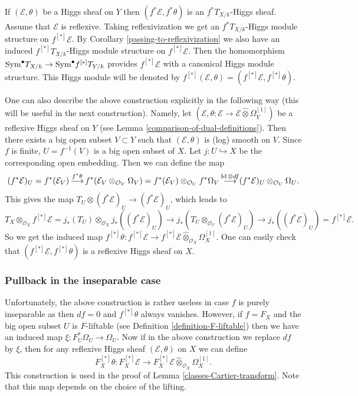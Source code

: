 \documentclass[12pt]{article}
\theoremstyle{plain}
\theoremstyle{definition}
\theoremstyle{remark}
\newcommand{\cE}{{\mathcal E}}
\newcommand{\cO}{{\mathcal O}}
\newcommand{\id}{\mathop{\rm Id}}
\newcommand{\Sym}{{\mathop{{\rm Sym}}}}
\begin{document}
If $(\cE, \theta)$ be a Higgs sheaf on $Y$ then 
$(f^*\cE , f^*\theta)$ is an $f^*T_{X/k}$-Higgs sheaf. Assume that $\cE$ is reflexive.
Taking reflexivization we get  an $f^*T_{X/k}$-Higgs module structure on $f^{[*]}\cE$. 
By Corollary \ref{passing-to-reflexivization} we also have an induced  $f^{[*]}T_{X/k}$-Higgs module
structure on $f^{[*]}\cE$. Then the homomorphism $\Sym^{\bullet}T_{X/k}\to \Sym^{\bullet} f^{[*]}T_{Y/k}$ provides $f^{[*]}\cE$ with a canonical Higgs module structure. This Higgs module will be denoted by 
$f^{[*]}(\cE, \theta)=(f^{[*]}\cE , f^{[*]}\theta)$.

\medskip


One can also describe the above construction explicitly in the following way (this will be useful in the next construction). Namely, let $(\cE, \theta: \cE\to \cE\hat {\otimes} \Omega_Y^{[1]})$ be a reflexive Higgs sheaf on $Y$ (see Lemma \ref{comparison-of-dual-definitions}).
Then there exists a big open subset $V\subset Y$ such that $(\cE, \theta)$ is (log) smooth on $V$.
Since $f$ is finite, $U=f^{-1}(V)$ is a big open subset of $X$. Let $j: U\hookrightarrow X$ be the corresponding open embedding. Then we can define the map
$$(f^*\cE)_U=f^*(\cE_V)\mathop{\longrightarrow}^{f^*\theta}f^*(\cE_V\otimes _{\cO_V} \Omega_V)= f^*(\cE_V)\otimes _{\cO_U} f^*\Omega_V\mathop{\longrightarrow}^{\id \otimes df} (f^*\cE)_U\otimes _{\cO_U} \Omega_U.$$
This gives the map $T_U\otimes (f^*\cE)_U\to (f^*\cE)_U$, which leads to
$$T_X\otimes _{\cO_X} f^{[*]}\cE=j_*(T_U)\otimes _{\cO_X}j_*((f^*\cE)_U)\to j_*(T_U\otimes_{\cO_U} (f^*\cE)_U)\to j_*((f^*\cE)_U)=f^{[*]}\cE.$$
So we get the induced map $f^{[*]}\theta : f^{[*]}\cE\to f^{[*]}\cE\hat{\otimes} _{\cO_{X}}\Omega_X ^{[1]}$.
One can easily check that $ (f^{[*]}\cE, f^{[*]}\theta)$ is  a reflexive Higgs sheaf on $X$.

\subsubsection{Pullback in the inseparable case}

Unfortunately, the above construction is rather useless in case $f$ is purely inseparable as then $df=0$
and $f^{[*]}\theta$ always vanishes. However, if $f=F_X$  and the big open subset $U$ is $F$-liftable
(see Definition \ref{definition-F-liftable}) then we have an induced map $\xi: F^*_U\Omega _U\to \Omega_U $. Now if in the above construction we replace $df$ by $\xi$, then for any reflexive Higgs sheaf  $(\cE, \theta)$ on $X$
we can define 
$$F_X^{[*]}\theta : F_X^{[*]}\cE\to F_X^{[*]}\cE\hat \otimes _{\cO_{X}}\Omega_X ^{[1]}.$$
This construction is used in the proof of Lemma \ref{classes-Cartier-transform}.
Note that this map depends on the choice of the lifting.
\end{document}
